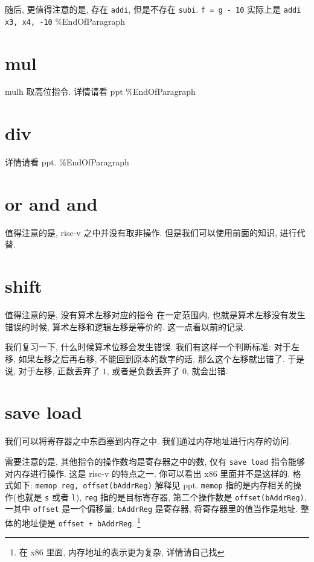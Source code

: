 \documentclass[11pt]{article}
\begin{document}
随后, 更值得注意的是, 存在 \texttt{addi}, 但是不存在 \texttt{subi}. 
\texttt{f = g - 10}
实际上是 \texttt{addi x3, x4, -10}
\%EndOfParagraph

\section{mul}
\label{sec:org674003f}
mulh 取高位指令. 详情请看 ppt 
\%EndOfParagraph

\section{div}
\label{sec:org997dbff}
详情请看 ppt. 
\%EndOfParagraph

\section{or and and}
\label{sec:orgff5a162}
值得注意的是, risc-v 之中并没有取非操作. 
但是我们可以使用前面的知识, 进行代替. 

\section{shift}
\label{sec:orgae63253}

值得注意的是, 没有算术左移对应的指令
在一定范围内, 也就是算术左移没有发生错误的时候, 算术左移和逻辑左移是等价的. 这一点看以前的记录. 

我们复习一下, 什么时候算术位移会发生错误. 我们有这样一个判断标准: 对于左移, 如果左移之后再右移, 不能回到原本的数字的话, 
那么这个左移就出错了. 于是说, 对于左移, 正数丢弃了 \(1\), 或者是负数丢弃了 \(0\), 就会出错.

\section{save load}
\label{sec:org8e2937b}

我们可以将寄存器之中东西塞到内存之中. 我们通过内存地址进行内存的访问. 

需要注意的是, 其他指令的操作数均是寄存器之中的数, 仅有 \texttt{save load} 指令能够对内存进行操作. 
这是 risc-v 的特点之一. 你可以看出 x86 里面并不是这样的. 格式如下: 
\texttt{memop reg, offset(bAddrReg)}
解释见 ppt. \texttt{memop} 指的是内存相关的操作(也就是 \texttt{s} 或者 \texttt{l}), \texttt{reg} 指的是目标寄存器, 第二个操作数是 
\texttt{offset(bAddrReg)}, 一其中 \texttt{offset} 是一个偏移量; \texttt{bAddrReg} 是寄存器, 将寄存器里的值当作是地址. 整体的地址便是 \texttt{offset + bAddrReg}. \footnote{在 x86 里面, 内存地址的表示更为复杂, 详情请自己找}
\end{document}
